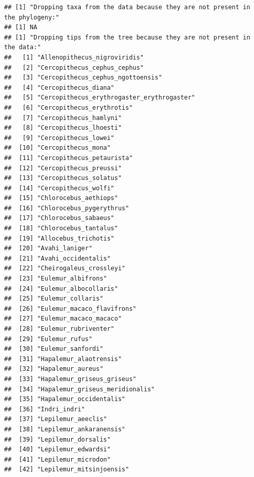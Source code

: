 \documentclass[]{article}
\begin{document}
\begin{verbatim}
## [1] "Dropping taxa from the data because they are not present in the phylogeny:"
## [1] NA
## [1] "Dropping tips from the tree because they are not present in the data:"
##   [1] "Allenopithecus_nigroviridis"                  
##   [2] "Cercopithecus_cephus_cephus"                  
##   [3] "Cercopithecus_cephus_ngottoensis"             
##   [4] "Cercopithecus_diana"                          
##   [5] "Cercopithecus_erythrogaster_erythrogaster"    
##   [6] "Cercopithecus_erythrotis"                     
##   [7] "Cercopithecus_hamlyni"                        
##   [8] "Cercopithecus_lhoesti"                        
##   [9] "Cercopithecus_lowei"                          
##  [10] "Cercopithecus_mona"                           
##  [11] "Cercopithecus_petaurista"                     
##  [12] "Cercopithecus_preussi"                        
##  [13] "Cercopithecus_solatus"                        
##  [14] "Cercopithecus_wolfi"                          
##  [15] "Chlorocebus_aethiops"                         
##  [16] "Chlorocebus_pygerythrus"                      
##  [17] "Chlorocebus_sabaeus"                          
##  [18] "Chlorocebus_tantalus"                         
##  [19] "Allocebus_trichotis"                          
##  [20] "Avahi_laniger"                                
##  [21] "Avahi_occidentalis"                           
##  [22] "Cheirogaleus_crossleyi"                       
##  [23] "Eulemur_albifrons"                            
##  [24] "Eulemur_albocollaris"                         
##  [25] "Eulemur_collaris"                             
##  [26] "Eulemur_macaco_flavifrons"                    
##  [27] "Eulemur_macaco_macaco"                        
##  [28] "Eulemur_rubriventer"                          
##  [29] "Eulemur_rufus"                                
##  [30] "Eulemur_sanfordi"                             
##  [31] "Hapalemur_alaotrensis"                        
##  [32] "Hapalemur_aureus"                             
##  [33] "Hapalemur_griseus_griseus"                    
##  [34] "Hapalemur_griseus_meridionalis"               
##  [35] "Hapalemur_occidentalis"                       
##  [36] "Indri_indri"                                  
##  [37] "Lepilemur_aeeclis"                            
##  [38] "Lepilemur_ankaranensis"                       
##  [39] "Lepilemur_dorsalis"                           
##  [40] "Lepilemur_edwardsi"                           
##  [41] "Lepilemur_microdon"                           
##  [42] "Lepilemur_mitsinjoensis"                      

\end{verbatim}
\end{document}
